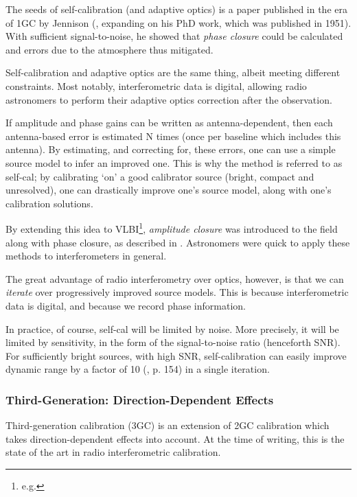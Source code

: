 \pg
The seeds of self-calibration (and adaptive optics) is a paper published in the era of 1GC by Jennison (, expanding on his PhD work, which was published in 1951). With sufficient signal-to-noise, he showed that \emph{phase closure} could be calculated and errors due to the atmosphere thus mitigated.

\pg
Self-calibration and adaptive optics are the same thing, albeit meeting different constraints. Most notably, interferometric data is digital, allowing radio astronomers to perform their adaptive optics correction after the observation.


\pg
If amplitude and phase gains can be written as antenna-dependent, then each antenna-based error is estimated N times (once per baseline which includes this antenna). By estimating, and correcting for, these errors, one can use a simple source model to infer an improved one. This is why the method is referred to as self-cal; by calibrating `on' a good calibrator source (bright, compact and unresolved), one can drastically improve one's source model, along with one's calibration solutions.

\pg
By extending this idea to VLBI\footnote{e.g.  }, \emph{amplitude closure} was introduced to the field along with phase closure, as described in . Astronomers were quick to apply these methods to interferometers in general.

\pg
The great advantage of radio interferometry over optics, however, is that we can \emph{iterate} over progressively improved source models. This is because interferometric data is digital, and because we record phase information.

\pg
In practice, of course, self-cal will be limited by noise. More precisely, it will be limited by sensitivity, in the form of the signal-to-noise ratio (henceforth SNR). For sufficiently bright sources, with high SNR, self-calibration can easily improve dynamic range by a factor of 10 (\cite{serendipitous}, p. 154) in a single iteration. 

\subsubsection{Third-Generation: Direction-Dependent Effects}

\pg
Third-generation calibration (3GC) is an extension of 2GC calibration which takes direction-dependent effects into account. At the time of writing, this is the state of the art in radio interferometric calibration.

